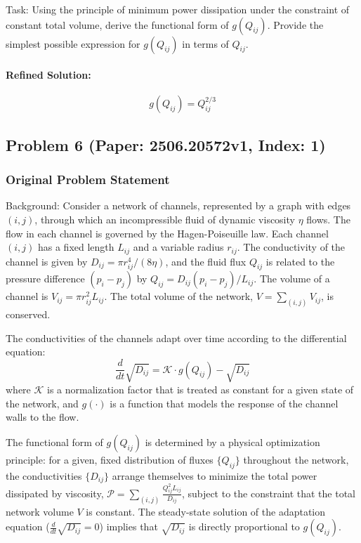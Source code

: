 \documentclass[10pt]{article}
\begin{document}
Task:
Using the principle of minimum power dissipation under the constraint of constant total volume, derive the functional form of $g(Q_{ij})$. Provide the simplest possible expression for $g(Q_{ij})$ in terms of $Q_{ij}$.

\paragraph*{Refined Solution:}
\[ g(Q_{ij}) = Q_{ij}^{2/3} \]

\newpage
\subsection*{Problem 6 (Paper: 2506.20572v1, Index: 1)}

\subsubsection*{Original Problem Statement}
Background:
Consider a network of channels, represented by a graph with edges $(i,j)$, through which an incompressible fluid of dynamic viscosity $\eta$ flows. The flow in each channel is governed by the Hagen-Poiseuille law. Each channel $(i,j)$ has a fixed length $L_{ij}$ and a variable radius $r_{ij}$. The conductivity of the channel is given by $D_{ij} = \pi r_{ij}^4 / (8\eta)$, and the fluid flux $Q_{ij}$ is related to the pressure difference $(p_i - p_j)$ by $Q_{ij} = D_{ij}(p_i - p_j)/L_{ij}$. The volume of a channel is $V_{ij} = \pi r_{ij}^2 L_{ij}$. The total volume of the network, $V = \sum_{(i,j)} V_{ij}$, is conserved.

The conductivities of the channels adapt over time according to the differential equation:
$$ \frac{d}{dt}\sqrt{D_{ij}} = \mathcal{K} \cdot g(Q_{ij}) - \sqrt{D_{ij}} $$
where $\mathcal{K}$ is a normalization factor that is treated as constant for a given state of the network, and $g(\cdot)$ is a function that models the response of the channel walls to the flow.

The functional form of $g(Q_{ij})$ is determined by a physical optimization principle: for a given, fixed distribution of fluxes $\{Q_{ij}\}$ throughout the network, the conductivities $\{D_{ij}\}$ arrange themselves to minimize the total power dissipated by viscosity, $\mathcal{P} = \sum_{(i,j)} \frac{Q_{ij}^2 L_{ij}}{D_{ij}}$, subject to the constraint that the total network volume $V$ is constant. The steady-state solution of the adaptation equation ($\frac{d}{dt}\sqrt{D_{ij}} = 0$) implies that $\sqrt{D_{ij}}$ is directly proportional to $g(Q_{ij})$.
\end{document}
